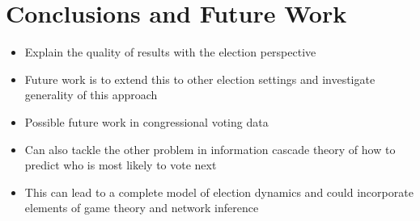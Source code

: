 \chapter{Conclusions and Future Work}
\begin{itemize}
    \item Explain the quality of results with the election perspective
    \item Future work is to extend this to other election settings and investigate generality of this approach
    \item Possible future work in congressional voting data
    \item Can also tackle the other problem in information cascade theory of how to predict who is most likely to vote next 
    \item This can lead to a complete model of election dynamics and could incorporate elements of game theory and network inference 
\end{itemize}
